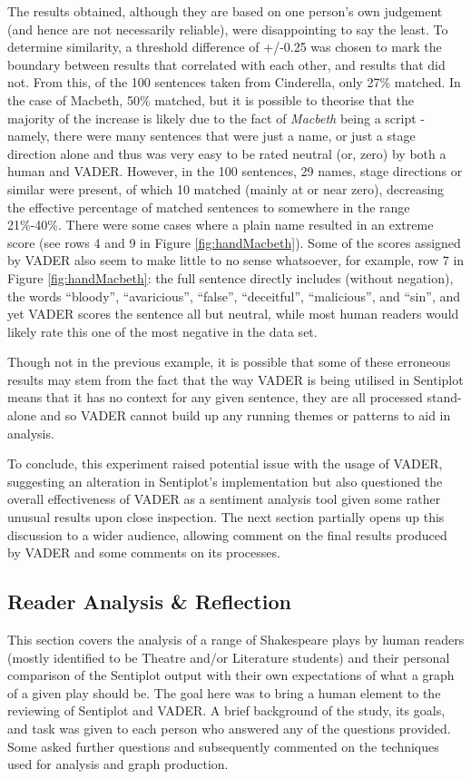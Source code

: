 \documentclass{article}
\begin{document}
{        The results obtained, although they are based on one person's own judgement (and hence are not necessarily reliable), were disappointing to say the least. To determine similarity, a threshold difference of +/-0.25 was chosen to mark the boundary between results that correlated with each other, and results that did not. From this, of the 100 sentences taken from Cinderella, only 27\% matched. In the case of Macbeth, 50\% matched, but it is possible to theorise that the majority of the increase is likely due to the fact of \textit{Macbeth} being a script - namely, there were many sentences that were just a name, or just a stage direction alone and thus was very easy to be rated neutral (or, zero) by both a human and VADER. However, in the 100 sentences, 29 names, stage directions or similar were present, of which 10 matched (mainly at or near zero), decreasing the effective percentage of matched sentences to somewhere in the range 21\%-40\%. There were some cases where a plain name resulted in an extreme score (see rows 4 and 9 in Figure \ref{fig:handMacbeth}). Some of the scores assigned by VADER also seem to make little to no sense whatsoever, for example, row 7 in Figure \ref{fig:handMacbeth}: the full sentence directly includes (without negation), the words ``bloody'', ``avaricious'', ``false'', ``deceitful'', ``malicious'', and ``sin'', and yet VADER scores the sentence all but neutral, while most human readers would likely rate this one of the most negative in the data set.

        Though not in the previous example, it is possible that some of these erroneous results may stem from the fact that the way VADER is being utilised in Sentiplot means that it has no context for any given sentence, they are all processed stand-alone and so VADER cannot build up any running themes or patterns to aid in analysis.

        To conclude, this experiment raised potential issue with the usage of VADER, suggesting an alteration in Sentiplot's implementation but also questioned the overall effectiveness of VADER as a sentiment analysis tool given some rather unusual results upon close inspection. The next section partially opens up this discussion to a wider audience, allowing comment on the final results produced by VADER and some comments on its processes.
    \subsection{Reader Analysis \& Reflection}
    \label{subsec:reader}
        This section covers the analysis of a range of Shakespeare plays by human readers (mostly identified to be Theatre and/or Literature students) and their personal comparison of the Sentiplot output with their own expectations of what a graph of a given play should be. The goal here was to bring a human element to the reviewing of Sentiplot and VADER. A brief background of the study, its goals, and task was given to each person who answered any of the questions provided. Some asked further questions and subsequently commented on the techniques used for analysis and graph production.
}
\end{document}
